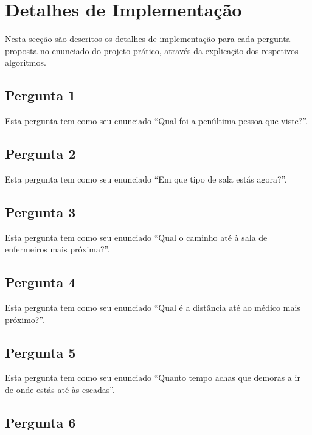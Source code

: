 \section{Detalhes de Implementação}
\label{sec::implement:details}

Nesta secção são descritos os detalhes de implementação para cada pergunta proposta no enunciado do projeto prático, através da explicação dos respetivos algoritmos.


\subsection{Pergunta 1}
\label{ssec::implement:details:perg1}

Esta pergunta tem como seu enunciado ``Qual foi a penúltima pessoa que viste?''.


\subsection{Pergunta 2}
\label{ssec::implement:details:perg2}

Esta pergunta tem como seu enunciado ``Em que tipo de sala estás agora?''.


\subsection{Pergunta 3}
\label{ssec::implement:details:perg3}

Esta pergunta tem como seu enunciado ``Qual o caminho até à sala de enfermeiros mais próxima?''.


\subsection{Pergunta 4}
\label{ssec::implement:details:perg4}

Esta pergunta tem como seu enunciado ``Qual é a distância até ao médico mais próximo?''.


\subsection{Pergunta 5}
\label{ssec::implement:details:perg5}

Esta pergunta tem como seu enunciado ``Quanto tempo achas que demoras a ir de onde estás até às escadas''.


\subsection{Pergunta 6}
\label{ssec::implement:details:perg6}

